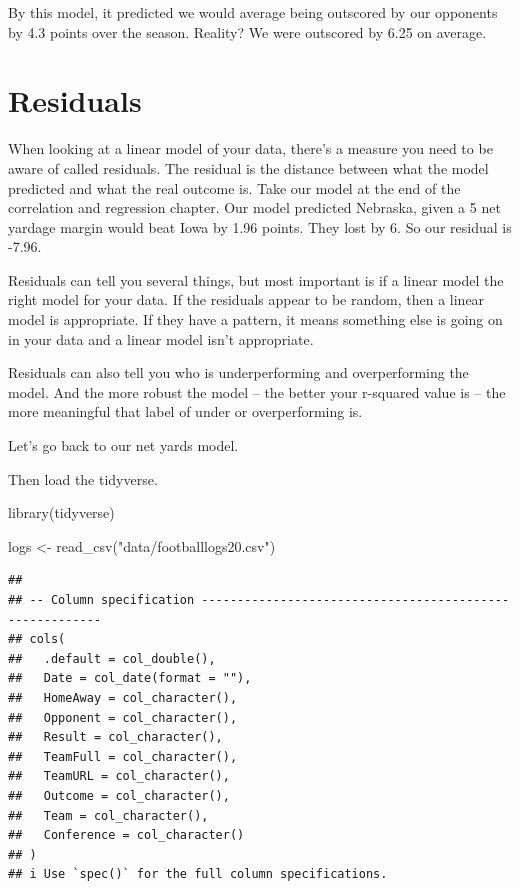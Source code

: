 \documentclass[
]{book}
\newenvironment{Shaded}{\begin{snugshade}}{\end{snugshade}}
\newcommand{\FunctionTok}[1]{\textcolor[rgb]{0.00,0.00,0.00}{#1}}
\newcommand{\NormalTok}[1]{#1}
\newcommand{\OtherTok}[1]{\textcolor[rgb]{0.56,0.35,0.01}{#1}}
\newcommand{\StringTok}[1]{\textcolor[rgb]{0.31,0.60,0.02}{#1}}
\begin{document}
By this model, it predicted we would average being outscored by our opponents by 4.3 points over the season. Reality? We were outscored by 6.25 on average.

\hypertarget{residuals}{%
\chapter{Residuals}\label{residuals}}

When looking at a linear model of your data, there's a measure you need to be aware of called residuals. The residual is the distance between what the model predicted and what the real outcome is. Take our model at the end of the correlation and regression chapter. Our model predicted Nebraska, given a 5 net yardage margin would beat Iowa by 1.96 points. They lost by 6. So our residual is -7.96.

Residuals can tell you several things, but most important is if a linear model the right model for your data. If the residuals appear to be random, then a linear model is appropriate. If they have a pattern, it means something else is going on in your data and a linear model isn't appropriate.

Residuals can also tell you who is underperforming and overperforming the model. And the more robust the model -- the better your r-squared value is -- the more meaningful that label of under or overperforming is.

Let's go back to our net yards model.

Then load the tidyverse.

\begin{Shaded}
\begin{Highlighting}[]
\FunctionTok{library}\NormalTok{(tidyverse)}
\end{Highlighting}
\end{Shaded}

\begin{Shaded}
\begin{Highlighting}[]
\NormalTok{logs }\OtherTok{\textless{}{-}} \FunctionTok{read\_csv}\NormalTok{(}\StringTok{"data/footballlogs20.csv"}\NormalTok{)}
\end{Highlighting}
\end{Shaded}

\begin{verbatim}
## 
## -- Column specification --------------------------------------------------------
## cols(
##   .default = col_double(),
##   Date = col_date(format = ""),
##   HomeAway = col_character(),
##   Opponent = col_character(),
##   Result = col_character(),
##   TeamFull = col_character(),
##   TeamURL = col_character(),
##   Outcome = col_character(),
##   Team = col_character(),
##   Conference = col_character()
## )
## i Use `spec()` for the full column specifications.
\end{verbatim}
\end{document}
